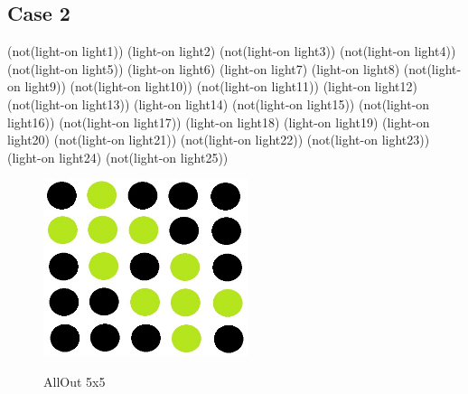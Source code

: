  \subsection{Case 2}  \newline
 \newline
 \newline
  \newline
(not(light-on light1)) 
(light-on light2) 
(not(light-on light3)) 
(not(light-on light4)) 
(not(light-on light5))
 \newline
(light-on light6) 
(light-on light7) 
(light-on light8) 
(not(light-on light9)) 
(not(light-on light10))
 \newline
(not(light-on light11)) 
(light-on light12) 
(not(light-on light13)) 
(light-on light14) 
(not(light-on light15))
 \newline
(not(light-on light16)) 
(not(light-on light17)) 
(light-on light18) 
(light-on light19) 
(light-on light20)
 \newline
(not(light-on light21)) 
(not(light-on light22)) 
(not(light-on light23)) 
(light-on light24) 
(not(light-on light25))
\newline
\begin{figure}[h]
\centering
\includegraphics[width=6cm]{text/images/pic4.jpeg}\\
\newline
\caption{AllOut 5x5}
\end{figure} \newline \newline

\pagebreak